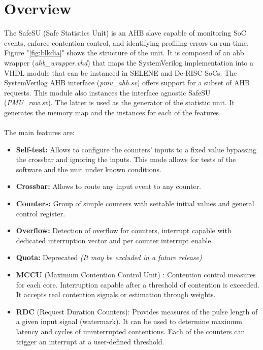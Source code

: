 \newpage
\section{Overview}
\label{chapter1}
The SafeSU (Safe Statistics Unit) is an AHB slave capable of monitoring SoC events, enforce contention control, and identifying profiling errors on run-time.
Figure "\ref{fig:blkdia}" shows the structure of the unit. It is composed of an ahb wrapper (\textit{ahb\_wrapper.vhd}) that maps the SystemVerilog implementation into a VHDL module that can be instanced in SELENE and De-RISC SoCs.  The SystemVerilog AHB interface (\textit{pmu\_ahb.sv}) offers support for a subset of AHB requests. This module also instances the interface agnostic SafeSU (\textit{PMU\_raw.sv}). The latter is used as the generator of the statistic unit. It generates the memory map and the instances for each of the features.\\
\\
The main features are:\\
\begin{itemize}
	\item \textbf{Self-test:} Allows to configure the counters' inputs to a fixed value bypassing the crossbar and ignoring the inputs. This mode allows for tests of the software and the unit under known conditions.
	\item \textbf{Crossbar:} Allows to route any input event to any counter.
	\item \textbf{Counters:} Group of simple counters with settable initial values and general control register.
	\item \textbf{Overflow:} Detection of overflow for counters, interrupt capable with dedicated interruption vector and per counter interrupt enable.
	\item \textbf{Quota:} Deprecated \textit{(It may be excluded in a future release)}
	\item \textbf{MCCU }(Maximum Contention Control Unit) : Contention control measures for each core. Interruption capable after a threshold of contention is exceeded. It accepts real contention signals or estimation through weights.
	\item \textbf{RDC }(Request Duration Counters): Provides measures of the pulse length of a given input signal (watermark). It can be used to determine maximum latency and cycles of uninterrupted contentions. Each of the counters can trigger an interrupt at a user-defined threshold.
\end{itemize}

